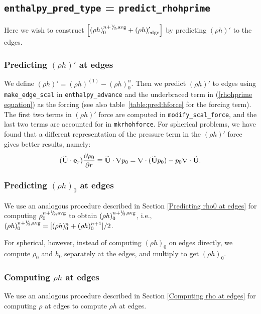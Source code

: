 \subsection{{\tt enthalpy\_pred\_type} = {\tt predict\_rhohprime}}

Here we wish to construct $\left [ (\rho h)_0^{n+\myhalf,{\rm avg}} + (\rho
  h)'_\mathrm{edge} \right ]$ by predicting $(\rho h)'$ to the edges.

\subsubsection{Predicting $(\rho h)'$ at edges}\label{Predicting rhohprime at edges}

We define $(\rho h)' = (\rho h)^{(1)} - (\rho h)_0^n$.  Then we predict 
$(\rho h)'$ to edges using {\tt make\_edge\_scal} in {\tt enthalpy\_advance} 
and the underbraced term in (\ref{rhohprime equation}) as the forcing (see
also table~\ref{table:pred:hforce} for the forcing term).
The first two terms in $(\rho h)'$ force are computed in 
{\tt modify\_scal\_force}, and the last two terms are accounted for in
{\tt mkrhohforce}.  For spherical problems, we have found that a different 
representation of the pressure term in the $(\rho h)'$ force gives better
results, namely:
\begin{equation}
(\widetilde{{\bf U}} \cdot \mathbf{e}_r)\frac{\partial p_0}{\partial r} \equiv \widetilde{{\bf U}}\cdot\nabla p_0 = 
\nabla\cdot(\widetilde{{\bf U}} p_0) - p_0\nabla\cdot\widetilde{{\bf U}}.
\end{equation}



\subsubsection{Predicting $(\rho h)_0$ at edges}
We use an analogous procedure described in Section \ref{Predicting
rho0 at edges} for computing $\rho_0^{n+\myhalf,\rm{avg}}$ to obtain 
$(\rho h)_0^{n+\myhalf,\rm{avg}}$, i.e., 
$(\rho h)_0^{n+\myhalf,{\rm avg}} = [(\rho h)_0^{n} + (\rho h)_0^{n+1}]/2$.

For spherical, however, instead of computing $(\rho h)_0$ on edges
directly, we compute $\rho_0$ and $h_0$ separately at the edges, and
multiply to get $(\rho h)_0$.


\subsubsection{Computing $\rho h$ at edges}
We use an analogous procedure described in Section \ref{Computing rho
  at edges} for computing $\rho$ at edges to compute $\rho h$ at
edges.  



